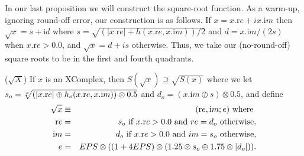 In our last proposition we will construct the square-root function.  As a warm-up, ignoring round-off error, our
construction is as follows.  If $x = x.{\mathrm re} + i x.{\mathrm im}$ then $\sqrt{x} = s + {\mathrm i d}$ where $s=\sqrt{(|x.{\mathrm
re}| + h(x.{\mathrm re},x.{\mathrm im}))/2}$ and $d = x.{\mathrm im}/(2s)$ when $x.{\mathrm re} > 0.0$, and $\sqrt{x} = d + i s$ otherwise.  
Thus, we take our (no-round-off) square roots to be in the first and fourth quadrants.

\begin{proposition}\label{GMT prop7.14}{($\sqrt{X}$)}
If $x$ is an {\textrm XComplex,} then $S(\sqrt{x}) \supseteq \sqrt{S(x)}$
where we
let $s_o = \root o \of {(|x.{\mathrm re}| \oplus h_o (x.{\mathrm re},x.{\mathrm im})) \otimes 0.5}$
 and $d_o = (x.{\mathrm im} \oslash s) \otimes 0.5${\textrm ,} and define
\begin{eqnarray*}
 \sqrt{x} & \equiv &({\mathrm re},{\mathrm im};e) \hbox{ where }\\
 {\mathrm re} &=& s_o \hbox{ if $x.{\mathrm re} > 0.0$ and $re = d_o$ otherwise},\\
{\mathrm im}& =& d_o \hbox{ if $x.{\mathrm re} > 0.0$ and $im = s_o$ otherwise},
\\
e& =& EPS \otimes ((1 + 4 EPS) \otimes (1.25 \otimes s_o \oplus 1.75 \otimes |d_o|)).
\end{eqnarray*}
\end{proposition}

